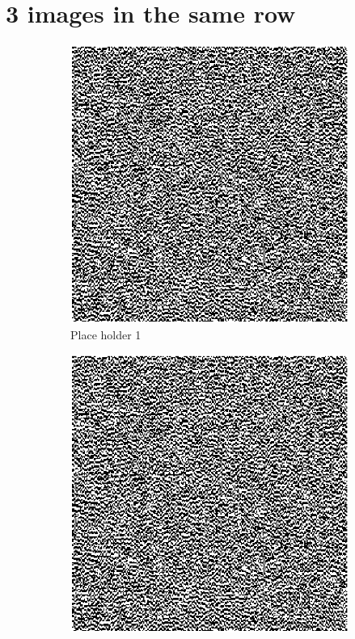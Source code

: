 \section{3 images in the same row}
\begin{figure}[htbp!]
\centering
	\begin{subfigure}{0.3\linewidth}
		\includegraphics[width = \textwidth]{Ch2_Images/DBS_hologram.png}
		\caption{Place holder 1}
		\label{fig:TargetImage}
	\end{subfigure}
	\begin{subfigure}{0.3\linewidth}
		\includegraphics[width = \textwidth]{Ch2_Images/DBS_hologram.png}

\end{subfigure}
\end{figure}
